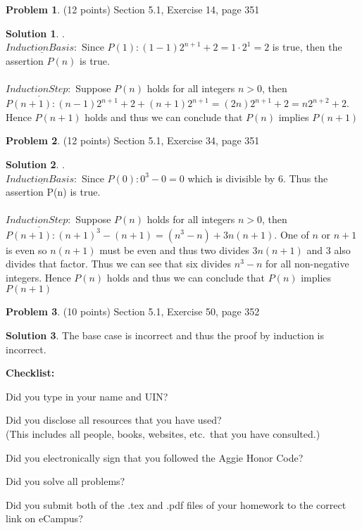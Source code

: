 \documentclass{article}
\theoremstyle{definition}
\newtheorem{problem}{Problem}
\newtheorem*{solution}{Solution}
\newcommand{\checklist}{\noindent\textbf{Checklist:}
\begin{compactitem}[$\Box$] 
\item Did you type in your name and UIN? 
\item Did you disclose all resources that you have used? \\
(This includes all people, books, websites, etc.\ that you have consulted.)
\item Did you electronically sign that you followed the Aggie Honor Code? 
\item Did you solve all problems? 
\item Did you submit both of the .tex and .pdf files of your homework to the correct link 
on eCampus? 
\end{compactitem}
}
\begin{document}
\begin{problem} (12 points) 
Section 5.1, Exercise 14, page 351
\end{problem}
\begin{solution}.
\\$\underline{Induction Basis:}$ Since $P(1): (1 - 1)2^{n+1} + 2 = 1\cdot2^1 = 2$ is true, then the assertion $P(n)$ is true.
\\\\$\underline{Induction Step:}$ Suppose $P(n)$ holds for all integers $n>0$, then \\$P(n+1): (n - 1)2^{n+1} + 2 + (n + 1)2^{n + 1} = (2n)2^{n+1} + 2 = n2^{n + 2} + 2$. Hence $P(n+1)$ holds and thus we can conclude that $P(n)$ implies $P(n+1)$
\end{solution}

\begin{problem} (12 points) 
Section 5.1, Exercise 34, page 351
\end{problem}
\begin{solution}.
\\$\underline{Induction Basis:}$ Since $P(0): 0^3 - 0 = 0$ which is divisible by $6$. Thus the assertion P(n) is true.
\\\\$\underline{Induction Step:}$ Suppose $P(n)$ holds for all integers $n>0$, then \\$P(n+1): (n+1)^3 - (n + 1) = (n^3 - n) + 3n(n + 1).$ One of $n$ or $n + 1$ is even so $n(n + 1)$ must be even and thus two divides $3n(n + 1)$ and 3 also divides that factor. Thus we can see that six divides $n^3 - n$ for all non-negative integers. Hence $P(n)$ holds and thus we can conclude that $P(n)$ implies $P(n + 1)$
\end{solution}

\begin{problem} (10 points) 
Section 5.1, Exercise 50, page 352
\end{problem}
\begin{solution}
The base case is incorrect and thus the proof by induction is incorrect.
\end{solution}

\goodbreak
\checklist
\end{document}
